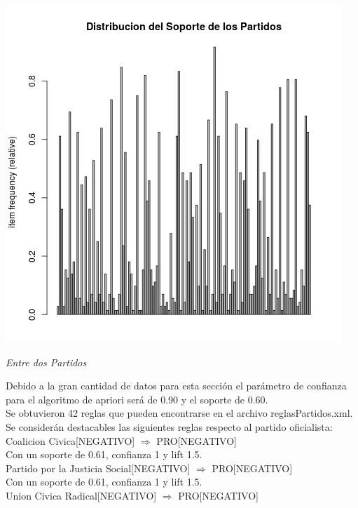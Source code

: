 \documentclass{endm}
\begin{document}
\begin{center}
\includegraphics[scale=0.4]{graficos/soportesPartidos.png}
\end{center}

\textit{Entre dos Partidos}

Debido a la gran cantidad de datos para esta sección el parámetro de confianza para el algoritmo de apriori será de 0.90 y el soporte de 0.60. \\

Se obtuvieron 42 reglas que pueden encontrarse en el archivo reglasPartidos.xml.  \\

Se considerán destacables las siguientes reglas respecto al partido oficialista: \\

{Coalicion Civica[NEGATIVO]} $\Longrightarrow$ {PRO[NEGATIVO]} \\

Con un soporte de 0.61, confianza 1 y lift 1.5.\\

{Partido por la Justicia Social[NEGATIVO]} $\Longrightarrow$ {PRO[NEGATIVO]} \\

Con un soporte de 0.61, confianza 1 y lift 1.5.\\

{Union Civica Radical[NEGATIVO]}  $\Longrightarrow$ {PRO[NEGATIVO]}\\
\end{document}

